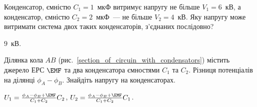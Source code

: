 \begin{problem}
    Конденсатор, ємністю $C_1 = 1$~мкФ витримує напругу не більше $V_1 = 6$~кВ, а конденсатор, ємністю $C_2 = 2$~мкФ~--- не більше $V_2 = 4$~кВ. Яку напругу може витримати система двох таких конденсаторів, з'єднаних послідовно?
\begin{solution}
	$9$~кВ.
\end{solution}
\end{problem}

\begin{problem}\label{prb:section_of_circuin_with_condensators}
    Ділянка кола $AB$ (рис.~\ref{section_of_circuin_with_condensators}) містить джерело ЕРС $\EMF$ та два конденсатора ємностями $C_1$ та $C_2$. Різниця потенціалів на ділянці $\phi_A - \phi_B$. Знайдіть напругу на конденсаторах.
\begin{solution}
	$U_1 = \frac{\phi_A - \phi_B + \EMF}{C_1 + C_2} C_2$,
	$U_2 = \frac{\phi_A - \phi_B + \EMF}{C_1 + C_2} C_1$.
\end{solution}
\end{problem}


